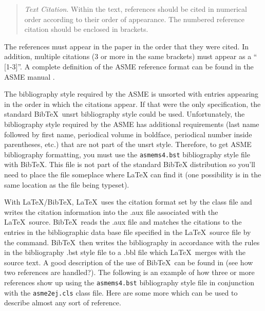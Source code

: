 \documentclass[twocolumn,10pt]{asme2ej}
\begin{document}
\begin{quotation}
{\em Text Citation}. Within the text, references should be cited in  numerical order according to their order of appearance.  The numbered reference citation should be enclosed in brackets.
\end{quotation}

The references must appear in the paper in the order that they were cited.  In addition, multiple citations (3 or more in the same brackets) must appear as a `` [1-3]''.  A complete definition of the ASME reference format can be found in the  ASME manual \cite{asmemanual}.

The bibliography style required by the ASME is unsorted with entries appearing in the order in which the citations appear. If that were the only specification, the standard {\sc Bib}\TeX\ unsrt bibliography style could be used. Unfortunately, the bibliography style required by the ASME has additional requirements (last name followed by first name, periodical volume in boldface, periodical number inside parentheses, etc.) that are not part of the unsrt style. Therefore, to get ASME bibliography formatting, you must use the \verb+asmems4.bst+ bibliography style file with {\sc Bib}\TeX. This file is not part of the standard BibTeX distribution so you'll need to place the file someplace where LaTeX can find it (one possibility is in the same location as the file being typeset).

With \LaTeX/{\sc Bib}\TeX, \LaTeX\ uses the citation format set by the class file and writes the citation information into the .aux file associated with the \LaTeX\ source. {\sc Bib}\TeX\ reads the .aux file and matches the citations to the entries in the bibliographic data base file specified in the \LaTeX\ source file by the \verb++ command. {\sc Bib}\TeX\ then writes the bibliography in accordance with the rules in the bibliography .bst style file to a .bbl file which \LaTeX\ merges with the source text.  A good description of the use of {\sc Bib}\TeX\ can be found in \cite{latex, goosens} (see how two references are handled?).  The following is an example of how three or more references \cite{latex, asmemanual,  goosens} show up using the \verb+asmems4.bst+ bibliography style file in conjunction with the \verb+asme2ej.cls+ class file. Here are some more \cite{art, blt, ibk, icn, ips, mts, mis, pro, pts, trt, upd} which can be used to describe almost any sort of reference.

\end{document}
